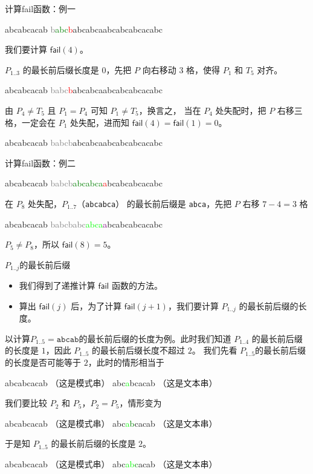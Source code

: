 \documentclass{ctexbeamer}
\newcommand{\red}[1]{\textcolor{red}{#1}}
\newcommand{\green}[1]{\textcolor{green}{#1}}
\newcommand{\gray}[1]{\textcolor{gray}{#1}}
\newcommand{\lime}[1]{\textcolor{lime}{#1}}
\newcommand{\purple}[1]{\textcolor{purple}{#1}}
\newcommand{\str}[1]{\texttt{#1}}
\newcommand{\fail}{\mathsf{fail}}
\begin{document}
\begin{frame}[fragile]{计算fail函数：例一}
\begin{tverb}
 abcabcacab
\gray{b}\green{abc}\red{b}abcabcaabcabcabcacabc
\end{tverb}
我们要计算 $\fail(4)$。

$P_{1..3}$ 的最长前后缀长度是 $0$，先把 $P$ 向右移动 $3$ 格，使得 $P_1$ 和 $T_5$ 对齐。

\begin{tverb}
    abcabcacab
\gray{babc}\red{b}abcabcaabcabcabcacabc
\end{tverb}

由 $P_4 \ne T_5$ 且 $P_1 = P_4$ 可知 $P_1 \ne T_5$，换言之，
当在 $P_4$ 处失配时，把 $P$ 右移三格，一定会在 $P_1$ 处失配，进而知 $\fail(4) = \fail(1) = 0$。

\begin{tverb}
     abcabcacab
\gray{babcb}abcabcaabcabcabcacabc
\end{tverb}

\end{frame}
\begin{frame}[fragile]{计算fail函数：例二}
\begin{tverb}
     abcabcacab
\gray{babcb}\green{abcabca}\red{a}bcabcabcacabc
\end{tverb}
在 $P_8$ 处失配，$P_{1..7}$（\str{abcabca}） 的最长前后缀是 \str{abca}，先把 $P$ 右移 $7 - 4 = 3$ 格
\begin{tverb}
        abcabcacab
\gray{babcbabc}\lime{abca}\purple{a}bcabcabcacabc
\end{tverb}
$P_5 \ne P_8$，所以 $\fail(8) = 5$。
\end{frame}

\begin{frame}[fragile]{$P_{1..j}$的最长前后缀}
\begin{itemize}
    \item 我们得到了递推计算 $\fail$ 函数的方法。
    \item 算出 $\fail(j)$ 后，为了计算 $\fail(j + 1)$，我们要计算 $P_{1..j}$ 的最长前后缀的长度。
\end{itemize}

以计算$P_{1..5} = \str{abcab}$的最长前后缀的长度为例。此时我们知道 $P_{1..4}$ 的最长前后缀的长度是 $1$，因此 $P_{1..5}$ 的最长前后缀长度不超过 $2$。
我们先看 $P_{1..5}$的最长前后缀的长度是否可能等于 $2$，此时的情形相当于
\begin{tverb}
   abcabcacab （这是模式串）
abc\lime{a}bcacab    （这是文本串）
\end{tverb}
我们要比较 $P_2$ 和 $P_5$，$P_2 = P_5$，情形变为
\begin{tverb}
   abcabcacab （这是模式串）
abc\lime{a}\green{b}cacab    （这是文本串）
\end{tverb}
于是知 $P_{1..5}$ 的最长前后缀的长度是 $2$。

\begin{tverb}
   abcabcacab （这是模式串）
abc\lime{ab}\green{c}acab    （这是文本串）
\end{tverb}

\end{frame}
\end{document}

